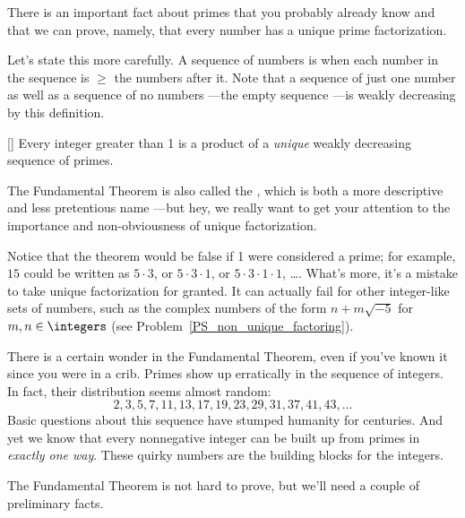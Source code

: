 There is an important fact about primes that you probably already know and that we can
prove, namely, that every number has a unique prime factorization.

Let's state this more carefully.  A sequence of numbers is \emph{}
when each number in the sequence is $\ge$ the numbers after it.  Note that a sequence of
just one number as well as a sequence of no numbers ---the empty sequence ---is weakly
decreasing by this definition.

\begin{theorem}\label{thm:unique_factor}[]
Every integer greater than 1 is a product of a \emph{unique} weakly decreasing sequence of
primes.
\end{theorem}

The Fundamental Theorem is also called the , which is
both a more descriptive and less pretentious name ---but hey, we really want to get your
attention to the importance and non-obviousness of unique factorization.

Notice that the theorem would be false if 1 were considered a prime; for example, $15$
could be written as $5 \cdot 3$, or $5 \cdot 3 \cdot 1$, or $5 \cdot 3 \cdot 1 \cdot 1$,
\dots.  What's more, it's a mistake to take unique factorization for granted.  It can
actually fail for other integer-like sets of numbers, such as the complex numbers of the
form $n + m\sqrt{-5}$ for $m,n \in \integers$ (see Problem~\ref{PS_non_unique_factoring}).

There is a certain wonder in the Fundamental Theorem, even if you've known it since you
were in a crib.  Primes show up erratically in the sequence of integers.  In fact, their
distribution seems almost random:
\[
2, 3, 5, 7, 11, 13, 17, 19, 23, 29, 31, 37, 41, 43, \dots
\]
Basic questions about this sequence have stumped humanity for centuries.  And yet we know
that every nonnegative integer can be built up from primes in \emph{exactly one way}.
These quirky numbers are the building blocks for the integers.

The Fundamental Theorem is not hard to prove, but we'll need a couple of preliminary facts.

